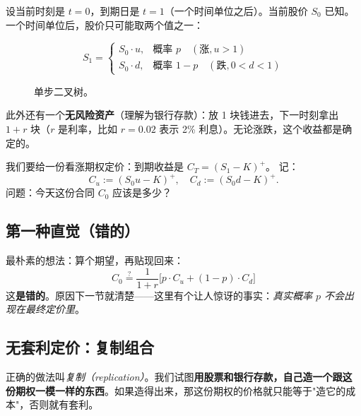 \documentclass[11pt,a4paper]{ctexart}
\newcommand{\1}{\mathbf{1}}
\begin{document}
设当前时刻是 $t = 0$，到期日是 $t = 1$（一个时间单位之后）。当前股价 $S_0$ 已知。一个时间单位后，股价只可能取两个值之一：

\[
S_1 = \begin{cases}
S_0 \cdot u, & \text{概率 } p \quad (\text{涨}, u > 1) \\
S_0 \cdot d, & \text{概率 } 1-p \quad (\text{跌}, 0 < d < 1)
\end{cases}
\]

\begin{figure}[h]
\centering
{}
\caption{单步二叉树。}
\end{figure}

此外还有一个\textbf{无风险资产}（理解为银行存款）：放 1 块钱进去，下一时刻拿出 $1 + r$ 块（$r$ 是利率，比如 $r = 0.02$ 表示 2\% 利息）。无论涨跌，这个收益都是确定的。

我们要给一份看涨期权定价：到期收益是 $C_T = (S_1 - K)^+$。
记：
\[
C_u := (S_0 u - K)^+, \quad C_d := (S_0 d - K)^+.
\]
问题：今天这份合同 $C_0$ 应该是多少？

\subsection{第一种直觉（错的）}

最朴素的想法：算个期望，再贴现回来：
\[
C_0 \stackrel{?}{=} \frac{1}{1+r}\bigl[p\cdot C_u + (1-p)\cdot C_d\bigr]
\]
这\textbf{是错的}。原因下一节就清楚——这里有个让人惊讶的事实：\emph{真实概率 $p$ 不会出现在最终定价里}。

\subsection{无套利定价：复制组合}

正确的做法叫\emph{复制（replication）}。我们试图\textbf{用股票和银行存款，自己造一个跟这份期权一模一样的东西}。如果造得出来，那这份期权的价格就只能等于"造它的成本"，否则就有套利。
\end{document}
